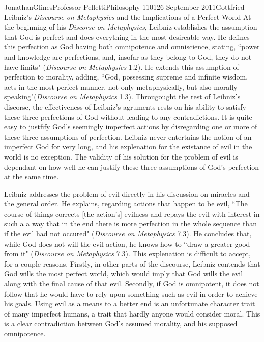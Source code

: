 \documentclass[12pt,letterpaper]{article}
\begin{document}
\begin{mla}{Jonathan}{Glines}{Professor Pelletti}{Philosophy 1101}{26 September 2011}{Gottfried Leibniz's \textit{Discourse on Metaphysics} and the Implications of a Perfect World}
At the beginning of his \textit{Discorse on Metaphysics}, Leibniz establishes the assumption that God is perfect and does everything in the most desireable way. He defines this perfection as God having both omnipotence and omniscience, stating, ``power and knowledge are perfections, and, insofar as they belong to God, they do not have limits" (\textit{Discourse on Metaphysics} 1.2). He extends this assumption of perfection to morality, adding, ``God, possessing supreme and infinite wisdom, acts in the most perfect manner, not only metaphysically, but also morally speaking"(\textit{Discourse on Metaphysics} 1.3). Througought the rest of Leibniz's discorse, the effectiveness of Leibniz's agruments rests on his ability to satisfy these three perfections of God without leading to any contradictions. It is quite easy to justfify God's seemingly imperfect actions by disregarding one or more of these three assumptions of perfection. Leibniz never entertains the notion of an imperfect God for very long, and his explenation for the existance of evil in the world is no exception. The validity of his solution for the problem of evil is dependant on how well he can justify these three assumptions of God's perfection at the same time.

Leibniz addresses the problem of evil directly in his discussion on miracles and the general order. He explains, regarding actions that happen to be evil, ``The course of things corrects [the action's] evilness and repays the evil with interest in such a a way that in the end there is more perfection in the whole sequence than if the evil had not occured" (\textit{Discourse on Metaphysics} 7.3). He concludes that, while God does not will the evil action, he knows how to ``draw a greater good from it" (\textit{Discourse on Metaphysics} 7.3). This explenation is difficult to accept, for a couple reasons. Firstly, in other parts of the discourse, Leibniz contends that God wills the most perfect world, which would imply that God wills the evil along with the final cause of that evil. Secondly, if God is omnipotent, it does not follow that he would have to rely upon something such as evil in order to achieve his goals. Using evil as a means to a better end is an unfortunate character trait of many imperfect humans, a trait that hardly anyone would consider moral. This is a clear contradiction between God's assumed morality, and his supposed omnipotence.


\end{mla}
\end{document}
